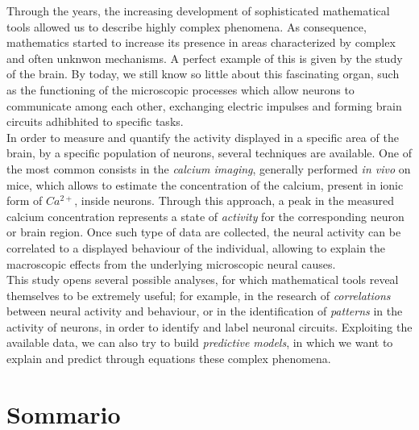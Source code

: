 \documentclass[12pt, a4paper]{report}
\begin{document}
	Through the years, the increasing development of sophisticated mathematical tools allowed us to describe highly complex phenomena. As consequence, mathematics started to increase its presence in areas characterized by complex and often unknwon mechanisms.  A perfect example of this is given by the study of the brain. By today, we still know so little about this fascinating organ, such as the functioning of the microscopic processes which allow neurons to communicate among each other, exchanging electric impulses and forming brain circuits adhibhited to specific tasks.\\
In order to measure and quantify the activity displayed in a specific area of the brain, by a specific population of neurons, several techniques are available. One of the most common consists in the \textit{calcium imaging}, generally performed \textit{in vivo} on mice, which allows to estimate the concentration of the calcium, present in ionic form of $Ca^{2+}$, inside neurons. Through this approach, a peak in the measured calcium concentration represents a state of \textit{activity} for the corresponding neuron or brain region. Once such type of data are collected, the neural activity can be correlated to a displayed behaviour of the individual, allowing to explain the macroscopic effects from the underlying microscopic neural causes.\\
This study opens several possible analyses, for which mathematical tools reveal themselves to be extremely useful; for example, in the research of \textit{correlations} between neural activity and behaviour, or in the identification of \textit{patterns} in the activity of neurons, in order to identify and label neuronal circuits. Exploiting the available data, we can also try to build \textit{predictive models}, in which we want to explain and predict through equations these complex phenomena.\\

	
	\chapter*{Sommario}
		
\end{document}
